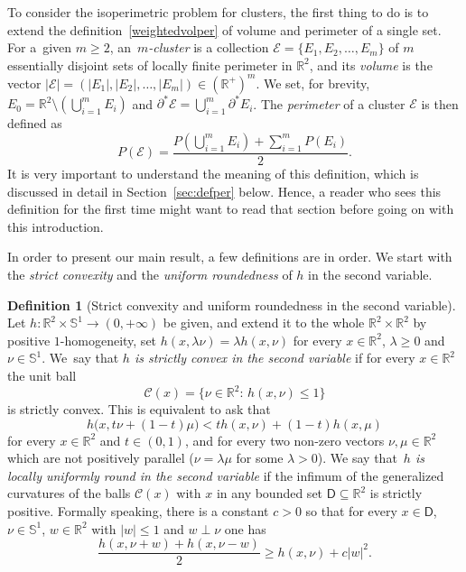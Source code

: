 \documentclass[JEP,XML,SOM,Unicode,NoFloatCountersInSection]{cedram}
\newcommand\R{\mathbb{R}}
\renewcommand\S{\mathbb{S}}
\newcommand\C{\mathcal{C}}
\newcommand\E{\mathcal{E}}
\theoremstyle{plain}
\theoremstyle{definition}
\newtheorem{defn}[thm]{Definition}
\begin{document}
To consider the isoperimetric problem for clusters, the first thing to do is to extend the definition~\eqref{weightedvolper} of volume and perimeter of a single set. For a~given $m\geq 2$, an~\emph{$m$\nobreakdash-cluster} is a collection $\E=\{E_1,E_2,\dots, E_m\}$ of $m$ essentially disjoint sets of local\-ly finite perimeter in $\R^2$, and its \emph{volume} is the vector $|\E|=(|E_1|, |E_2|,\dots, |E_m|)\in (\R^+)^m$. We set, for brevity, $E_0=\R^2\setminus (\bigcup_{i=1}^m E_i)$ and $\partial^* \E=\bigcup_{i=1}^m \partial^* E_i$. The \emph{perimeter} of a cluster $\E$ is then defined as
\begin{equation}\label{PbE}
P(\E) = \frac{P(\bigcup_{i=1}^m E_i) + \sum_{i=1}^m P(E_i) }2 .
\end{equation}
It is very important to understand the meaning of this definition, which is discussed in detail in Section~\ref{sec:defper} below. Hence, a reader who sees this definition for the first time might want to read that section before going on with this introduction.

In order to present our main result, a few definitions are in order. We start with the \emph{strict convexity} and the \emph{uniform roundedness} of $h$ in the second variable.
\begin{defn}[Strict convexity and uniform roundedness in the second variable]\label{strictconv}
Let $h:\R^2\times\S^1\to (0,+\infty)$ be given, and extend it to the whole $\R^2\times\R^2$ by positive $1$-homogeneity, \ie set $h(x,\lambda\nu)=\lambda h(x,\nu)$ for every $x\in\R^2$, $\lambda\geq 0$ and $\nu\in\S^1$. We~say that \emph{$h$ is strictly convex in the second variable} if for every $x\in\R^2$ the unit ball
\begin{equation}\label{unitball}
\C(x) = \big\{ \nu\in\R^2:\, h(x,\nu)\leq 1\big\}
\end{equation}
is strictly convex. This is equivalent to ask that
\[
h\big(x,t\nu+(1-t)\mu\big) < th(x,\nu) + (1-t) h(x,\mu)
\]
for every $x\in\R^2$ and $t\in(0,1)$, and for every two non-zero vectors $\nu,\mu\in\R^2$ which are not positively parallel (\ie $\nu=\lambda\mu$ for some $\lambda>0$). We say that~\emph{$h$ is locally uniformly round in the second variable} if the infimum of the generalized curvatures of the balls $\C(x)$ with $x$ in any bounded set $\mathsf{D}\subseteq\R^2$ is strictly positive. Formally speaking, there is a constant $c>0$ so that for every $x\in \mathsf{D}$, $\nu\in \S^1$, $w\in\R^2$ with $|w|\leq 1$ and $w\perp \nu$ one has\vspace*{-3pt}\enlargethispage{.5\baselineskip}%
\begin{equation}\label{numero}
\frac{h(x,\nu+w) + h(x,\nu-w)}2 \geq h(x,\nu) + c |w|^2.
\end{equation}
\end{defn}
\end{document}
